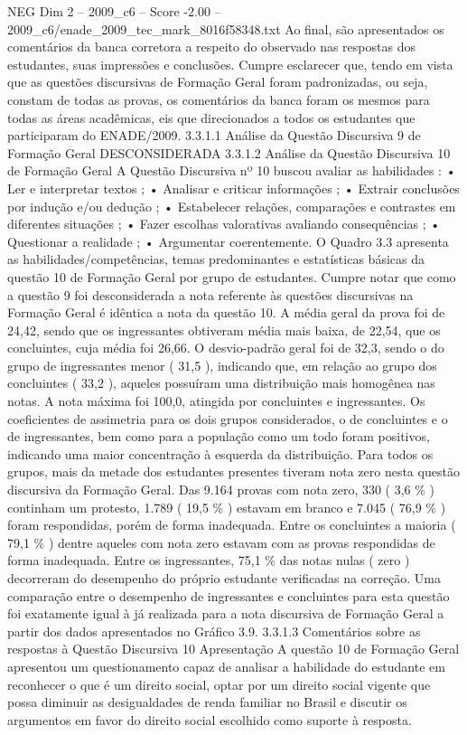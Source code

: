 \begin{textsample}{NEG Dim 2 – 2009\_c6 – Score -2.00 – 2009\_c6/enade\_2009\_tec\_mark\_8016f58348.txt}
Ao final, são apresentados os comentários da banca corretora a respeito do observado nas respostas dos estudantes, suas impressões e conclusões.
Cumpre esclarecer que, tendo em vista que as questões discursivas de Formação Geral foram padronizadas, ou seja, constam de todas as provas, os comentários da banca foram os mesmos para todas as áreas acadêmicas, eis que direcionados a todos os estudantes que participaram do ENADE/2009. 3.3.1.1 Análise da Questão Discursiva 9 de Formação Geral DESCONSIDERADA 3.3.1.2 Análise da Questão Discursiva 10 de Formação Geral A Questão Discursiva nº 10 buscou avaliar as habilidades : • Ler e interpretar textos ; • Analisar e criticar informações ; • Extrair conclusões por indução e/ou dedução ; • Estabelecer relações, comparações e contrastes em diferentes situações ; • Fazer escolhas valorativas avaliando consequências ; • Questionar a realidade ; • Argumentar coerentemente.
O Quadro 3.3 apresenta as habilidades/competências, temas predominantes e estatísticas básicas da questão 10 de Formação Geral por grupo de estudantes.
Cumpre notar que como a questão 9 foi desconsiderada a nota referente às questões discursivas na Formação Geral é idêntica a nota da questão 10.
A média geral da prova foi de 24,42, sendo que os ingressantes obtiveram média mais baixa, de 22,54, que os concluintes, cuja média foi 26,66.
O desvio-padrão geral foi de 32,3, sendo o do grupo de ingressantes menor ( 31,5 ), indicando que, em relação ao grupo dos concluintes ( 33,2 ), aqueles possuíram uma distribuição mais homogênea nas notas.
A nota máxima foi 100,0, atingida por concluintes e ingressantes.
Os coeficientes de assimetria para os dois grupos considerados, o de concluintes e o de ingressantes, bem como para a população como um todo foram positivos, indicando uma maior concentração à esquerda da distribuição.
Para todos os grupos, mais da metade dos estudantes presentes tiveram nota zero nesta questão discursiva da Formação Geral.
Das 9.164 provas com nota zero, 330 ( 3,6 \% ) continham um protesto, 1.789 ( 19,5 \% ) estavam em branco e 7.045 ( 76,9 \% ) foram respondidas, porém de forma inadequada.
Entre os concluintes a maioria ( 79,1 \% ) dentre aqueles com nota zero estavam com as provas respondidas de forma inadequada.
Entre os ingressantes, 75,1 \% das notas nulas ( zero ) decorreram do desempenho do próprio estudante verificadas na correção.
Uma comparação entre o desempenho de ingressantes e concluintes para esta questão foi exatamente igual à já realizada para a nota discursiva de Formação Geral a partir dos dados apresentados no Gráfico 3.9. 3.3.1.3 Comentários sobre as respostas à Questão Discursiva 10 Apresentação A questão 10 de Formação Geral apresentou um questionamento capaz de analisar a habilidade do estudante em reconhecer o que é um direito social, optar por um direito social vigente que possa diminuir as desigualdades de renda familiar no Brasil e discutir os argumentos em favor do direito social escolhido como suporte à resposta.

\end{textsample}
